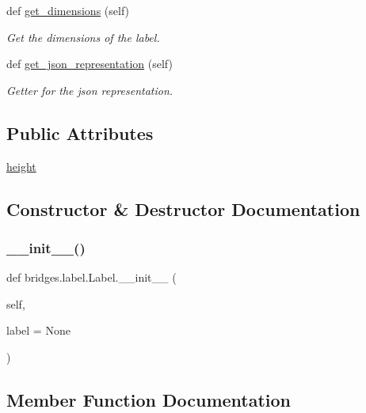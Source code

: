 \begin{DoxyCompactItemize}
def \hyperlink{classbridges_1_1label_1_1_label_a627bc596c7e3db837e3b1575282e1b98}{get\+\_\+dimensions} (self)
\begin{DoxyCompactList}\small\item\em Get the dimensions of the label. \end{DoxyCompactList}\item 
def \hyperlink{classbridges_1_1label_1_1_label_a5075b73938ca71eed43af12f26a71842}{get\+\_\+json\+\_\+representation} (self)
\begin{DoxyCompactList}\small\item\em Getter for the json representation. \end{DoxyCompactList}\end{DoxyCompactItemize}
\subsection*{Public Attributes}
\begin{DoxyCompactItemize}
\item 
\hyperlink{classbridges_1_1label_1_1_label_a2bf622aa77b4ad7d6918db99a8bfd4da}{height}
\end{DoxyCompactItemize}


\subsection{Constructor \& Destructor Documentation}
\mbox{\label{classbridges_1_1label_1_1_label_a9a6a9ba4ccb2757f0577d741d730c95c}} 
\subsubsection{\texorpdfstring{\+\_\+\+\_\+init\+\_\+\+\_\+()}{\_\_init\_\_()}}
{\footnotesize\ttfamily def bridges.\+label.\+Label.\+\_\+\+\_\+init\+\_\+\+\_\+ (\begin{DoxyParamCaption}\item[{}]{self,  }\item[{}]{label = {\ttfamily None} }\end{DoxyParamCaption})}



\subsection{Member Function Documentation}
\mbox{\label{classbridges_1_1label_1_1_label_ae1f120fa56b03e9937357a830bff7cf6}} 
